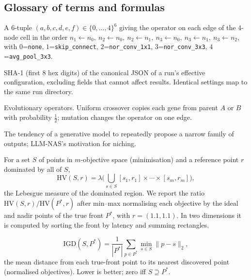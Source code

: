 \documentclass[pdflatex,sn-mathphys-num]{sn-jnl}
\newcommand{\code}[1]{\texttt{#1}}
\newcommand{\HV}{\mathrm{HV}}
\newcommand{\IGD}{\mathrm{IGD}}
\begin{document}
\begin{appendices}
\section{Glossary of terms and formulas}\label{sec:glossary}
\begin{description}[style=nextline,leftmargin=0pt,itemsep=3pt]

\item[Architecture code (NB201).] A 6-tuple $(a,b,c,d,e,f)\in\{0,\dots,4\}^6$ giving the operator on each edge of the 4-node cell in the order $n_1{\leftarrow}n_0,\ n_2{\leftarrow}n_0,\ n_2{\leftarrow}n_1,\ n_3{\leftarrow}n_0,\ n_3{\leftarrow}n_1,\ n_3{\leftarrow}n_2$, with $0$=\code{none}, $1$=\code{skip\_connect}, $2$=\code{nor\_conv\_1x1}, $3$=\code{nor\_conv\_3x3}, $4$=\code{avg\_pool\_3x3}.

\item[Configuration hash.] SHA-1 (first 8 hex digits) of the canonical JSON of a run's effective configuration, excluding fields that cannot affect results. Identical settings map to the same run directory.

\item[Crossover / mutation.] Evolutionary operators. Uniform crossover copies each gene from parent $A$ or $B$ with probability $\tfrac12$; mutation changes the operator on one edge.

\item[Exploration bias / mode collapse.] The tendency of a generative model to repeatedly propose a narrow family of outputs; LLM-NAS's motivation for niching.

\item[Hypervolume (HV).] For a set $S$ of points in $m$-objective space (minimisation) and a reference point $r$ dominated by all of $S$,
\[
\HV(S,r)=\lambda\Big(\bigcup_{s\in S}[s_1,r_1]\times\cdots\times[s_m,r_m]\Big),
\]
the Lebesgue measure of the dominated region. We report the ratio $\HV(S,r)/\HV(P^\ast,r)$ after min--max normalising each objective by the ideal and nadir points of the true front $P^\ast$, with $r=(1.1,1.1)$. In two dimensions it is computed by sorting the front by latency and summing rectangles.

\item[Inverted generational distance (IGD).]
\[
\IGD(S,P^\ast)=\frac{1}{|P^\ast|}\sum_{p\in P^\ast}\min_{s\in S}\lVert p-s\rVert_2,
\]
the mean distance from each true-front point to its nearest discovered point (normalised objectives). Lower is better; zero iff $S\supseteq P^\ast$.


\end{description}
\end{appendices}
\end{document}
